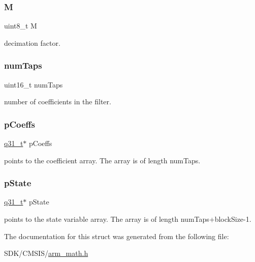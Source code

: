\subsubsection{\texorpdfstring{M}{M}}
{\footnotesize\ttfamily uint8\+\_\+t M}

decimation factor. \mbox{\label{structarm__fir__decimate__instance__q31_a751941891e47f522a7f5375fe8990aac}} 
\subsubsection{\texorpdfstring{num\+Taps}{numTaps}}
{\footnotesize\ttfamily uint16\+\_\+t num\+Taps}

number of coefficients in the filter. \mbox{\label{structarm__fir__decimate__instance__q31_a68888e36167d81cb7836db10367a1682}} 
\subsubsection{\texorpdfstring{p\+Coeffs}{pCoeffs}}
{\footnotesize\ttfamily \mbox{\hyperlink{arm__math_8h_adc89a3547f5324b7b3b95adec3806bc0}{q31\+\_\+t}}$\ast$ p\+Coeffs}

points to the coefficient array. The array is of length num\+Taps. \mbox{\label{structarm__fir__decimate__instance__q31_adee4ba3ee8869865af7d8fa08ca913d6}} 
\subsubsection{\texorpdfstring{p\+State}{pState}}
{\footnotesize\ttfamily \mbox{\hyperlink{arm__math_8h_adc89a3547f5324b7b3b95adec3806bc0}{q31\+\_\+t}}$\ast$ p\+State}

points to the state variable array. The array is of length num\+Taps+block\+Size-\/1. 

The documentation for this struct was generated from the following file\+:\begin{DoxyCompactItemize}
\item 
S\+D\+K/\+C\+M\+S\+I\+S/\mbox{\hyperlink{arm__math_8h}{arm\+\_\+math.\+h}}\end{DoxyCompactItemize}
